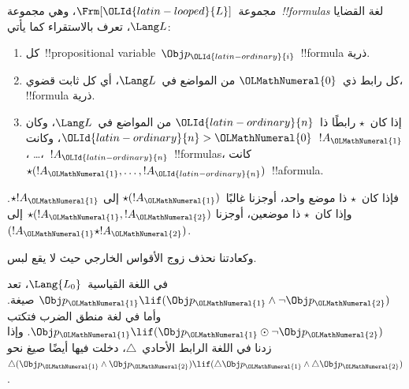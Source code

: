\documentclass[../../../include/open-logic-section]{subfiles}
\begin{document}


\begin{defn}[الصيغة]
مجموعة~$\Frm[\OLId{latin-looped}{L}]$، وهي مجموعة~\emph{!!{formula}s} لغة القضايا
$\Lang L$، تعرف بالاستقراء كما يأتي:
\begin{enumerate}
\item كل~!!{propositional variable}~$\Obj p_\OLId{latin-ordinary}{i}$~!!{formula} ذرية.
\item كل رابط ذي~$\OLMathNumeral{0}$ من المواضع في~$\Lang L$، أي كل ثابت قضوي،
!!{formula} ذرية.
\item إذا كان~$\star$ رابطًا ذا~$\OLId{latin-ordinary}{n}$ من المواضع في~$\Lang L$، وكان
$\OLId{latin-ordinary}{n}>\OLMathNumeral{0}$، وكانت~$!A_\OLMathNumeral{1}$، \dots،~$!A_\OLId{latin-ordinary}{n}$~!!{formula}s، كانت
$\star(!A_\OLMathNumeral{1}, \dots, !A_\OLId{latin-ordinary}{n})$~!!a{formula}.
\end{enumerate}
فإذا كان~$\star$ ذا موضع واحد، أوجزنا غالبًا~$\star(!A_\OLMathNumeral{1})$ إلى
$\star !A_\OLMathNumeral{1}$. وإذا كان~$\star$ ذا موضعين، أوجزنا
$\star(!A_\OLMathNumeral{1},!A_\OLMathNumeral{2})$ إلى~$(!A_\OLMathNumeral{1} \star !A_\OLMathNumeral{2})$.
\end{defn}

وكعادتنا نحذف زوج الأقواس الخارجي حيث لا يقع لبس.

\begin{ex}
  في اللغة القياسية~$\Lang{L_0}$، تعد
  $\Obj p_\OLMathNumeral{1} \lif (\Obj p_\OLMathNumeral{1} \land \lnot \Obj p_\OLMathNumeral{2})$ صيغة.
  وأما في لغة منطق الضرب فتكتب
  $\Obj p_\OLMathNumeral{1} \lif (\Obj p_\OLMathNumeral{1} \odot \lnot \Obj p_\OLMathNumeral{2})$.
  وإذا زدنا في اللغة الرابط الأحادي~$\triangle$، دخلت فيها أيضًا
  صيغ نحو~$\triangle (\Obj p_\OLMathNumeral{1} \land \Obj p_\OLMathNumeral{2}) \lif
  (\triangle \Obj p_\OLMathNumeral{1} \land \triangle \Obj p_\OLMathNumeral{2})$.
\end{ex}
\end{document}
